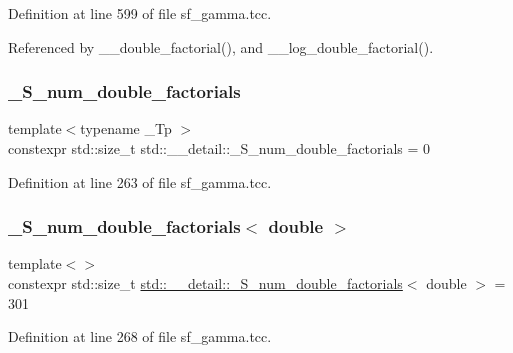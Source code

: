 Definition at line 599 of file sf\+\_\+gamma.\+tcc.



Referenced by \+\_\+\+\_\+double\+\_\+factorial(), and \+\_\+\+\_\+log\+\_\+double\+\_\+factorial().

\mbox{\label{namespacestd_1_1____detail_a762f5ed905d1f926bfd8b16f8ea2c568}} 
\subsubsection{\texorpdfstring{\+\_\+\+S\+\_\+num\+\_\+double\+\_\+factorials}{\_S\_num\_double\_factorials}}
{\footnotesize\ttfamily template$<$typename \+\_\+\+Tp $>$ \\
constexpr std\+::size\+\_\+t std\+::\+\_\+\+\_\+detail\+::\+\_\+\+S\+\_\+num\+\_\+double\+\_\+factorials = 0}



Definition at line 263 of file sf\+\_\+gamma.\+tcc.

\mbox{\label{namespacestd_1_1____detail_ae829eb6434a90060ee0650f1c71fb92d}} 
\subsubsection{\texorpdfstring{\+\_\+\+S\+\_\+num\+\_\+double\+\_\+factorials$<$ double $>$}{\_S\_num\_double\_factorials< double >}}
{\footnotesize\ttfamily template$<$$>$ \\
constexpr std\+::size\+\_\+t \hyperlink{namespacestd_1_1____detail_a762f5ed905d1f926bfd8b16f8ea2c568}{std\+::\+\_\+\+\_\+detail\+::\+\_\+\+S\+\_\+num\+\_\+double\+\_\+factorials}$<$ double $>$ = 301}



Definition at line 268 of file sf\+\_\+gamma.\+tcc.

